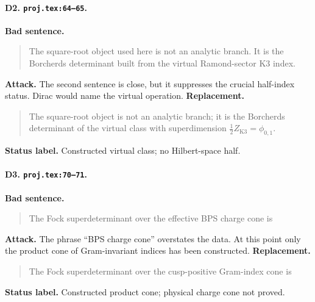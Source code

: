 \paragraph{D2. \texttt{proj.tex:64--65}.}
\textbf{Bad sentence.}
\begin{quote}\small
The square-root object used here is not an analytic branch.  It is the
Borcherds determinant built from the virtual Ramond-sector K3 index.
\end{quote}
\textbf{Attack.}
The second sentence is close, but it suppresses the crucial half-index
status.  Dirac would name the virtual operation.
\textbf{Replacement.}
\begin{quote}\small
The square-root object is not an analytic branch; it is the Borcherds
determinant of the virtual class with superdimension
\(\frac12 Z_{\mathrm{K3}}=\phi_{0,1}\).
\end{quote}
\textbf{Status label.} Constructed virtual class; no Hilbert-space half.

\paragraph{D3. \texttt{proj.tex:70--71}.}
\textbf{Bad sentence.}
\begin{quote}\small
The Fock superdeterminant over the effective BPS charge cone is
\end{quote}
\textbf{Attack.}
The phrase ``BPS charge cone'' overstates the data.  At this point only
the product cone of Gram-invariant indices has been constructed.
\textbf{Replacement.}
\begin{quote}\small
The Fock superdeterminant over the cusp-positive Gram-index cone is
\end{quote}
\textbf{Status label.} Constructed product cone; physical charge cone
not proved.

